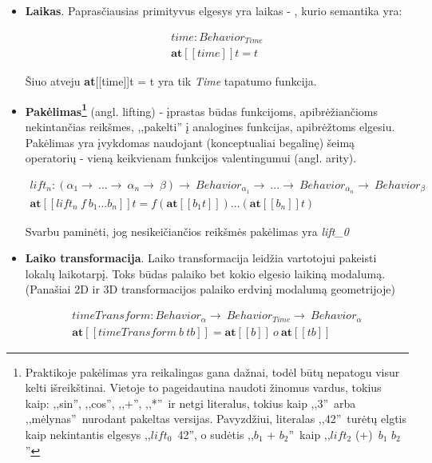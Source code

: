 \begin{itemize}
	
	\item \textbf{Laikas}. Paprasčiausias primityvus elgesys yra laikas - , kurio semantika yra:

\begin{gather*}
time: Behavior_{Time} \\
\textbf{at}[[time]]t = t
\end{gather*}

	Šiuo atveju \textbf{at}[[time]]t = t yra tik \textit{Time} tapatumo funkcija.

	\item \textbf{Pakėlimas\footnote{Praktikoje pakėlimas yra reikalingas gana dažnai, todėl būtų nepatogu visur kelti išreikštinai. Vietoje to pageidautina naudoti žinomus vardus, tokius kaip: ,,sin'', ,,cos'', ,,+'', ,,*''\ ir netgi literalus, tokius kaip ,,3''\ arba ,,mėlynas''\ nurodant pakeltas versijas. Pavyzdžiui, literalas ,,42''\ turėtų elgtis kaip nekintantis elgesys ,,$lift_{0}$\ 42'', o sudėtis ,,$b_{1}$ + $b_{2}$''\ kaip ,,$lift_{2}$ (+)\ $b_{1}$ $b_{2}$''}} (angl. lifting) - įprastas būdas funkcijoms, apibrėžiančioms nekintančias reikšmes, ,,pakelti'' į analogines funkcijas, apibrėžtoms elgesiu. Pakėlimas yra įvykdomas naudojant (konceptualiai begalinę) šeimą operatorių - vieną keikvienam funkcijos valentingumui (angl. arity).

\begin{gather*}
lift_{n} : ( \alpha_{1} \rightarrow\ ... \rightarrow\ \alpha_{n} \rightarrow\ \beta ) \rightarrow\
	Behavior_{\alpha_{1}} \rightarrow\ ... \rightarrow\ Behavior_{\alpha_{n}} \rightarrow\ Behavior_{\beta} \\
\textbf{at}[[lift_{n}\ f\ b_{1}...b_{n}]]t = f (\textbf{at}[[b_{1}t]])...(\textbf{at}[[b_{n}]]t)
\end{gather*}

	Svarbu paminėti, jog nesikeičiančios reikšmės pakėlimas yra \textit{lift_{0}}

	\item \textbf{Laiko transformacija}. Laiko transformacija leidžia vartotojui pakeisti lokalų laikotarpį. Toks būdas palaiko bet kokio elgesio laikiną modalumą. (Panašiai 2D ir 3D transformacijos palaiko erdvinį modalumą geometrijoje)

\begin{gather*}
timeTransform : Behavior_{\alpha} \rightarrow\ Behavior_{Time} \rightarrow\ Behavior_{\alpha} \\
\textbf{at}[[timeTransform\ b\ tb]] = \textbf{at}[[b]]\ o\ \textbf{at}[[tb]]
\end{gather*}


\end{itemize}
